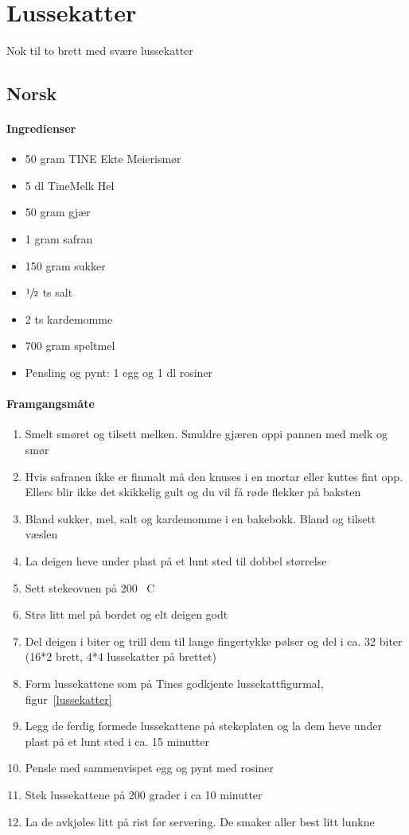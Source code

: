 \section{﻿Lussekatter}
Nok til to brett med svære lussekatter
\subsection{Norsk}

\paragraph{Ingredienser}
\begin{itemize}[noitemsep]
  \item 50 gram TINE Ekte Meierismør
  \item 5 dl TineMelk Hel
  \item 50 gram gjær
  \item 1 gram safran
  \item 150 gram sukker
  \item $\sfrac{1}{2}$ ts salt
  \item 2 ts kardemomme
  \item 700 gram speltmel
  \item Pensling og pynt: 1 egg og 1 dl rosiner
\end{itemize}

\paragraph{Framgangsmåte}
\begin{enumerate}[noitemsep]
  \item Smelt smøret og tilsett melken. Smuldre gjæren oppi pannen med melk og smør
  \item Hvis safranen ikke er finmalt må den knuses i en mortar eller kuttes fint opp. Ellers blir ikke det skikkelig gult og du vil få røde flekker på baksten
  \item Bland sukker, mel, salt og kardemomme i en bakebokk. Bland og tilsett væslen
  \item La deigen heve under plast på et lunt sted til dobbel størrelse
  \item Sett stekeovnen på 200 \degree~C
  \item Strø litt mel på bordet og elt deigen godt
  \item Del deigen i biter og trill dem til lange fingertykke pølser og del i ca. 32 biter (16*2 brett, 4*4 lussekatter på brettet)
  \item Form lussekattene som på Tines godkjente lussekattfigurmal, figur~\ref{lussekatter}
  \item Legg de ferdig formede lussekattene på stekeplaten og la dem heve under plast på et lunt sted i ca. 15 minutter
  \item Pensle med sammenvispet egg og pynt med rosiner
  \item Stek lussekattene på 200 grader i  ca 10 minutter
  \item La de avkjøles litt på rist før servering. De smaker aller best litt lunkne
\end{enumerate}

